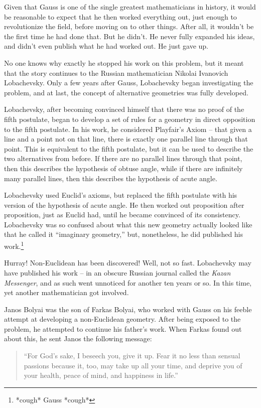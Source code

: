 \documentclass[12pt]{article}
\begin{document}
Given that Gauss is one of the single greatest mathematicians in history, it would be reasonable to expect that he then worked everything out, just enough to revolutionize the field, before moving on to other things. After all, it wouldn't be the first time he had done that. But he didn't. He never fully expanded his ideas, and didn't even publish what he had worked out. He just gave up.

No one knows why exactly he stopped his work on this problem, but it meant that the story continues to the Russian mathematician Nikolai Ivanovich Lobachevsky. Only a few years after Gauss, Lobachevsky began investigating the problem, and at last, the concept of alternative geometries was fully developed.

Lobachevsky, after becoming convinced himself that there was no proof of the fifth postulate, began to develop a set of rules for a geometry in direct opposition to the fifth postulate. In his work, he considered Playfair's Axiom -- that given a line and a point not on that line, there is exactly one parallel line through that point. This is equivalent to the fifth postulate, but it can be used to describe the two alternatives from before. If there are no parallel lines through that point, then this describes the hypothesis of obtuse angle, while if there are infinitely many parallel lines, then this describes the hypothesis of acute angle.

Lobachevsky used Euclid's axioms, but replaced the fifth postulate with his version of the hypothesis of acute angle. He then worked out proposition after proposition, just as Euclid had, until he became convinced of its consistency. Lobachevsky was so confused about what this new geometry actually looked like that he called it ``imaginary geometry,'' but, nonetheless, he did published his work.\footnote{*cough* Gauss *cough*}

Hurray! Non-Euclidean has been discovered! Well, not so fast. Lobachevsky may have published his work -- in an obscure Russian journal called the \textit{Kazan Messenger}, and as such went unnoticed for another ten years or so. In this time, yet another mathematician got involved.

Janos Bolyai was the son of Farkas Bolyai, who worked with Gauss on his feeble attempt at developing a non-Euclidean geometry. After being exposed to the problem, he attempted to continue his father's work. When Farkas found out about this, he sent Janos the following message:

\begin{quote}
``For God's sake, I beseech you, give it up. Fear it no less than sensual passions because it, too, may take up all your time, and deprive you of your health, peace of mind, and happiness in life.'' \cite{boyer2011history}
\end{quote}
\end{document}
